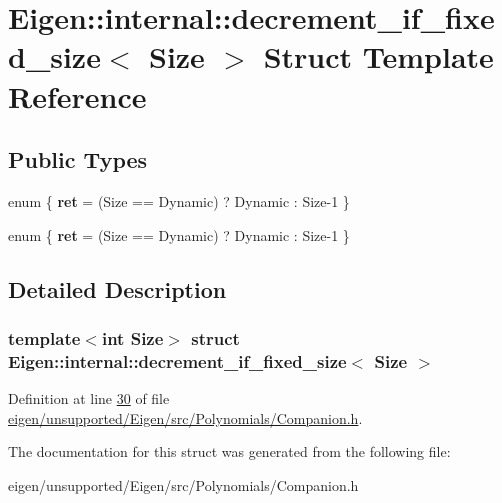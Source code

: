 \hypertarget{struct_eigen_1_1internal_1_1decrement__if__fixed__size}{}\section{Eigen\+:\+:internal\+:\+:decrement\+\_\+if\+\_\+fixed\+\_\+size$<$ Size $>$ Struct Template Reference}
\label{struct_eigen_1_1internal_1_1decrement__if__fixed__size}
\subsection*{Public Types}
\begin{DoxyCompactItemize}
\item 
\mbox{\label{struct_eigen_1_1internal_1_1decrement__if__fixed__size_a4a8bf07bc26ec80e19bf8b52b7f40a27}} 
enum \{ {\bfseries ret} = (Size == Dynamic) ? Dynamic \+: Size-\/1
 \}
\item 
\mbox{\label{struct_eigen_1_1internal_1_1decrement__if__fixed__size_a7f40faad222ca239a2af11309aa9b6ed}} 
enum \{ {\bfseries ret} = (Size == Dynamic) ? Dynamic \+: Size-\/1
 \}
\end{DoxyCompactItemize}


\subsection{Detailed Description}
\subsubsection*{template$<$int Size$>$\newline
struct Eigen\+::internal\+::decrement\+\_\+if\+\_\+fixed\+\_\+size$<$ Size $>$}



Definition at line \hyperlink{eigen_2unsupported_2_eigen_2src_2_polynomials_2_companion_8h_source_l00030}{30} of file \hyperlink{eigen_2unsupported_2_eigen_2src_2_polynomials_2_companion_8h_source}{eigen/unsupported/\+Eigen/src/\+Polynomials/\+Companion.\+h}.



The documentation for this struct was generated from the following file\+:\begin{DoxyCompactItemize}
\item 
eigen/unsupported/\+Eigen/src/\+Polynomials/\+Companion.\+h\end{DoxyCompactItemize}
